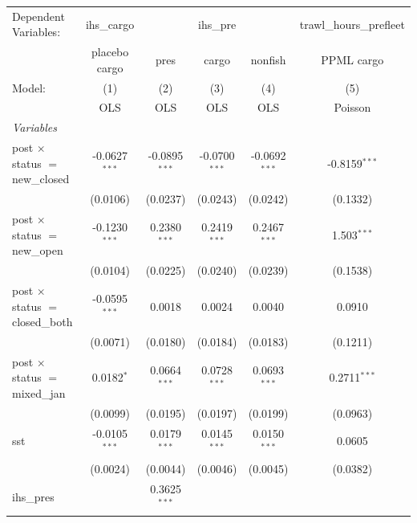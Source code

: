
\begingroup
\centering
\begin{tabular}{lccccc}
   \tabularnewline \midrule \midrule
   Dependent Variables: & ihs\_cargo & \multicolumn{3}{c}{ihs\_pre} & trawl\_hours\_prefleet\\
                                           & placebo cargo   & pres            & cargo           & nonfish         & PPML cargo \\   
   Model:                                  & (1)             & (2)             & (3)             & (4)             & (5)\\  
                                           &  OLS            & OLS             & OLS             & OLS             & Poisson\\  
   \midrule
   \emph{Variables}\\
   post $\times$ status $=$ new\_closed    & -0.0627$^{***}$ & -0.0895$^{***}$ & -0.0700$^{***}$ & -0.0692$^{***}$ & -0.8159$^{***}$\\   
                                           & (0.0106)        & (0.0237)        & (0.0243)        & (0.0242)        & (0.1332)\\   
   post $\times$ status $=$ new\_open      & -0.1230$^{***}$ & 0.2380$^{***}$  & 0.2419$^{***}$  & 0.2467$^{***}$  & 1.503$^{***}$\\   
                                           & (0.0104)        & (0.0225)        & (0.0240)        & (0.0239)        & (0.1538)\\   
   post $\times$ status $=$ closed\_both   & -0.0595$^{***}$ & 0.0018          & 0.0024          & 0.0040          & 0.0910\\   
                                           & (0.0071)        & (0.0180)        & (0.0184)        & (0.0183)        & (0.1211)\\   
   post $\times$ status $=$ mixed\_jan     & 0.0182$^{*}$    & 0.0664$^{***}$  & 0.0728$^{***}$  & 0.0693$^{***}$  & 0.2711$^{***}$\\   
                                           & (0.0099)        & (0.0195)        & (0.0197)        & (0.0199)        & (0.0963)\\   
   sst                                     & -0.0105$^{***}$ & 0.0179$^{***}$  & 0.0145$^{***}$  & 0.0150$^{***}$  & 0.0605\\   
                                           & (0.0024)        & (0.0044)        & (0.0046)        & (0.0045)        & (0.0382)\\   
   ihs\_pres                               &                 & 0.3625$^{***}$  &                 &                 &   \\   

\end{tabular}
